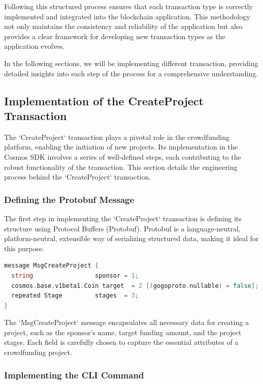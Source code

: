 Following this structured process ensures that each transaction type is correctly implemented and integrated into the blockchain application. This methodology not only maintains the consistency and reliability of the application but also provides a clear framework for developing new transaction types as the application evolves.

In the following sections, we will be implementing different transaction, providing detailed insights into each step of the process for a comprehensive understanding.

\subsection{Implementation of the CreateProject Transaction}

The `CreateProject` transaction plays a pivotal role in the crowdfunding platform, enabling the initiation of new projects. Its implementation in the Cosmos SDK involves a series of well-defined steps, each contributing to the robust functionality of the transaction. This section details the engineering process behind the `CreateProject` transaction.

\subsubsection{Defining the Protobuf Message}

The first step in implementing the `CreateProject` transaction is defining its structure using Protocol Buffers (Protobuf). Protobuf is a language-neutral, platform-neutral, extensible way of serializing structured data, making it ideal for this purpose.

\newpage
\begin{lstlisting}[language=go, caption=CreateProject protobuf definition, label={lst:create_project_proto}]
message MsgCreateProject {
  string                 sponsor = 1;
  cosmos.base.v1beta1.Coin target  = 2 [(gogoproto.nullable) = false];
  repeated Stage         stages  = 3;
}
\end{lstlisting}

The `MsgCreateProject` message encapsulates all necessary data for creating a project, such as the sponsor's name, target funding amount, and the project stages. Each field is carefully chosen to capture the essential attributes of a crowdfunding project.

\subsubsection{Implementing the CLI Command}

